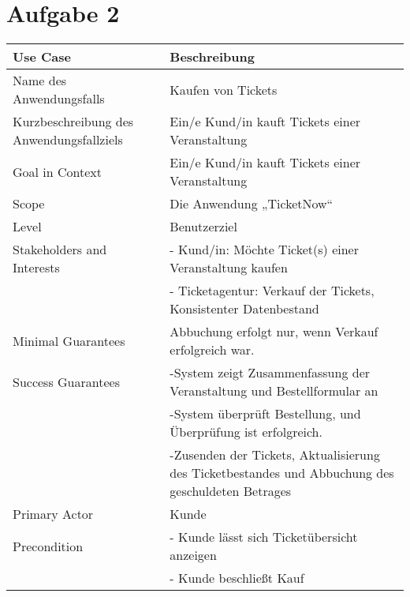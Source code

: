 \chapter*{Aufgabe 2}

\begin{tabular}{p{} p{}} 
	\hline
	Use Case & Beschreibung \\ 
	\hline
	Name des Anwendungsfalls & Kaufen von Tickets \\
	\hline
	Kurzbeschreibung des Anwendungsfallziels & Ein/e Kund/in kauft Tickets einer Veranstaltung \\
	\hline 
	Goal in Context & Ein/e Kund/in kauft Tickets einer Veranstaltung \\
	\hline
	Scope & Die Anwendung „TicketNow“ \\
	\hline
	Level & Benutzerziel \\
	\hline
	Stakeholders and Interests & - Kund/in: Möchte Ticket(s) einer Veranstaltung kaufen \\
	                             & - Ticketagentur: Verkauf der Tickets, Konsistenter Datenbestand \\
	\hline
	Minimal Guarantees & Abbuchung erfolgt nur, wenn Verkauf erfolgreich war. \\
	\hline
	Success Guarantees 	& -System zeigt Zusammenfassung der Veranstaltung und Bestellformular an \\
						& -System überprüft Bestellung, und Überprüfung ist erfolgreich. \\
						& -Zusenden der Tickets, Aktualisierung des Ticketbestandes und Abbuchung des geschuldeten Betrages\\

	
	
%	
	\hline
	Primary Actor & Kunde \\
	\hline
	Precondition & - Kunde lässt sich Ticketübersicht anzeigen \\
	             & - Kunde beschließt Kauf \\


\end{tabular}
